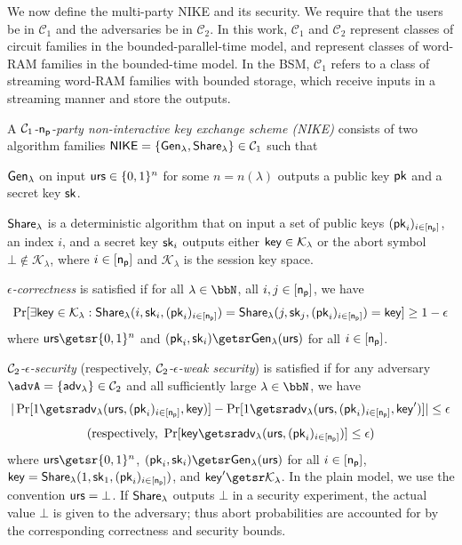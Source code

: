 
We now define the multi-party NIKE and its security. We require that the users be in $\mathcal C_1$ and the adversaries be in $\mathcal C_2$. In this work, $\mathcal C_1$ and $\mathcal C_2$ represent classes of circuit families in the bounded-parallel-time model, and represent classes of word-RAM families in the bounded-time model. In the BSM, $\mathcal C_1$ refers to a class of streaming word-RAM families with bounded storage, which receive inputs in a streaming manner and store the outputs.
\begin{definition}
\label{def:nike}
A \emph{$\mathcal{C}_1$-$\mathsf{n_p}$-party non-interactive key exchange scheme (NIKE)} consists of two algorithm families $\mathsf{NIKE}=\{{\mathsf{Gen}}_\lambda,\allowbreak{\mathsf{Share}}_\lambda\}\in\mathcal{C}_1$ such that
	\begin{compactitem}
	\item ${\mathsf{Gen}}_\lambda$ on input $\mathsf{urs}\in\{0, 1\}^n$ for some $n=n(\lambda)$ outputs a public key $\mathsf{pk}$ and a secret key $\mathsf{sk}$. 
	\item ${\mathsf{Share}}_\lambda$ is a deterministic algorithm that on input a set of public keys $(\mathsf{pk}_i)_{i\in{[\mathsf{n_p}]}}$, an index $i$, and a secret key $\mathsf{sk}_i$ outputs either $\mathsf{key}\in\mathcal K_\lambda$ or the abort symbol $\bot\notin\mathcal K_\lambda$, where $i\in{[\mathsf{n_p}]}$ and $\mathcal K_\lambda$ is the session key space.
	\end{compactitem}
	
	\emph{$\epsilon$-correctness} is satisfied if for all $\lambda\in\N$, all $i,j\in{[\mathsf{n_p}]}$, we have
	$$\Pr[\exists \mathsf{key}\in\mathcal K_\lambda:{\mathsf{Share}}_\lambda(i,\mathsf{sk}_i,(\mathsf{pk}_i)_{i\in{[\mathsf{n_p}]}})={\mathsf{Share}}_\lambda(j,\mathsf{sk}_j,(\mathsf{pk}_i)_{i\in{[\mathsf{n_p}]}})=\mathsf{key}]\geq 1-\epsilon
	$$
	where
	$\urs\getsr\bin^n$ and $(\pk_i,\sk_i)\getsr\Gen(\urs)$ for all $i\in{[\mathsf{n_p}]}$.

	\emph{$\mathcal{C}_2$-$\epsilon$-security} (respectively, \emph{$\mathcal{C}_2$-$\epsilon$-weak security}) is satisfied if for any adversary $\advA=\{\adv\}\in\cc_2$ and all sufficiently large $\lambda\in\N$, we have
$$|\Pr[1\getsr \adv(\urs,(\pk_i)_{i\in\cs},\key)]-\Pr[1\getsr \adv(\urs,(\pk_i)_{i\in\cs},\key')]|\leq\epsilon$$
$$(\mbox{respectively,}\ \Pr[\key\getsr \adv(\urs,(\pk_i)_{i\in\cs})]\leq\epsilon)$$
where $\urs\getsr\bin^n$, $(\pk_i,\sk_i)\getsr\Gen(\urs)$ for all $i\in{[\mathsf{n_p}]}$, $\mathsf{key}={\mathsf{Share}}_\lambda(1,\mathsf{sk}_1,(\mathsf{pk}_i)_{i\in{[\mathsf{n_p}]}})$, and $\key'\getsr\mathcal K_\lambda$.
In the plain model, we use the convention $\mathsf{urs}=\bot$.
If ${\mathsf{Share}}_\lambda$ outputs $\bot$ in a security experiment, the actual value $\bot$ is given to the adversary; thus abort probabilities are accounted for by the corresponding correctness and security bounds.


\end{definition}
